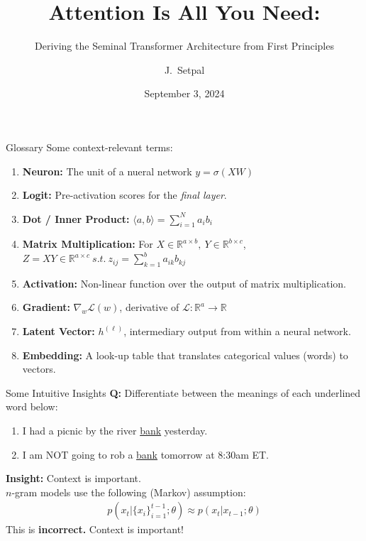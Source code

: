 \documentclass{beamer}
\title[Transformers]{Attention Is All You Need:}
\subtitle{Deriving the Seminal Transformer Architecture from First Principles}
\author[Machine Learning @ Purdue] %
{J.~Setpal}
\date{September 3, 2024}
\begin{document}
\frame{\titlepage}



\begin{frame}{Glossary}
	Some context-relevant terms:
	\begin{enumerate}[label=\alph*.]
		\item \textbf{Neuron:} The unit of a nueral network $y = \sigma(XW)$
		\item \textbf{Logit:} Pre-activation scores for the \textit{final layer}.
		\item \textbf{Dot / Inner Product:} $\langle a, b \rangle = \sum^N_{i=1}a_ib_i$
		\item \textbf{Matrix Multiplication:} For $X \in \mathbb{R}^{a \times b},\ Y \in \mathbb{R}^{b \times c}$, $Z = XY \in \mathbb{R}^{a \times c}\ s.t.\ z_{ij} = \sum^b_{k=1} a_{ik} b_{kj}$
		\item \textbf{Activation:} Non-linear function over the output of matrix multiplication.
		\item \textbf{Gradient:} $\nabla_w \mathcal{L}(w)$, derivative of $\mathcal{L}: \mathbb{R}^a \rightarrow \mathbb{R}$
		\item \textbf{Latent Vector:} $h^{(\ell)}$, intermediary output from within a neural network.
		\item \textbf{Embedding:} A look-up table that translates categorical values (words) to vectors.
	\end{enumerate}
\end{frame}

\begin{frame}{Some Intuitive Insights}
	\textbf{Q:} Differentiate between the meanings of each underlined word below:
	\begin{enumerate}[label=\alph*.]
		\item I had a picnic by the river \underline{bank} yesterday.
		\item I am NOT going to rob a \underline{bank} tomorrow at 8:30am ET.
	\end{enumerate} \pause

	\textbf{Insight:} Context is important. \pause \newline \\

	$n$-gram models use the following (Markov) assumption:
	\begin{gather}
	p\left(x_t | \{x_i\}^{t-1}_{i=1};\theta\right) \approx p\left(x_t | x_{t-1};\theta\right)
	\end{gather} \pause \vspace{-1.5em}
	This is \textbf{incorrect.} \pause Context is important!
\end{frame}
\end{document}
